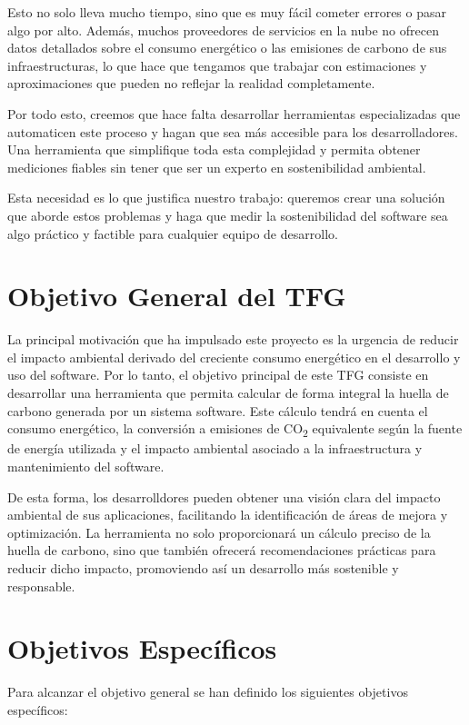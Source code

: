 \documentclass[12pt,a4paper]{report}
\begin{document}
Esto no solo lleva mucho tiempo, sino que es muy fácil cometer errores o pasar algo por alto. Además, muchos proveedores de servicios en la nube no ofrecen datos detallados sobre el consumo energético o las emisiones de carbono de sus infraestructuras, lo que hace que tengamos que trabajar con estimaciones y aproximaciones que pueden no reflejar la realidad completamente.

Por todo esto, creemos que hace falta desarrollar herramientas especializadas que automaticen este proceso y hagan que sea más accesible para los desarrolladores. Una herramienta que simplifique toda esta complejidad y permita obtener mediciones fiables sin tener que ser un experto en sostenibilidad ambiental.

Esta necesidad es lo que justifica nuestro trabajo: queremos crear una solución que aborde estos problemas y haga que medir la sostenibilidad del software sea algo práctico y factible para cualquier equipo de desarrollo.

\section{Objetivo General del TFG}

La principal motivación que ha impulsado este proyecto es la urgencia de
reducir el impacto ambiental derivado del creciente consumo energético en el
desarrollo y uso del software. Por lo tanto, el objetivo principal de este TFG
consiste en desarrollar una herramienta que permita calcular de forma integral
la huella de carbono generada por un sistema software. Este cálculo tendrá en
cuenta el consumo energético, la conversión a emisiones de CO\textsubscript{2}
equivalente según la fuente de energía utilizada y el impacto ambiental
asociado a la infraestructura y mantenimiento del software.

De esta forma, los desarrolldores pueden obtener una visión clara del impacto
ambiental de sus aplicaciones, facilitando la identificación de áreas de mejora
y optimización. La herramienta no solo proporcionará un cálculo preciso de la
huella de carbono, sino que también ofrecerá recomendaciones prácticas para
reducir dicho impacto, promoviendo así un desarrollo más sostenible y
responsable.

\section{Objetivos Específicos}

Para alcanzar el objetivo general se han definido los siguientes objetivos
específicos:
\end{document}
